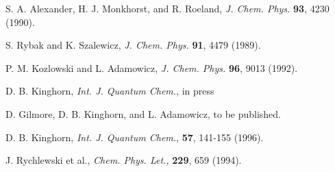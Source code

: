 \begin{thebibliography}{99}
  S. A. Alexander, H. J. Monkhorst, and R. Roeland, {\it %
J. Chem. Phys. }{\bf 93}, 4230 (1990).

  S. Rybak and K. Szalewicz, {\it J. Chem. Phys. }{\bf 91},
4479 (1989).

  P. M. Kozlowski and L. Adamowicz, {\it J. Chem. Phys.} 
{\bf 96}, 9013 (1992).

  D. B. Kinghorn, {\it Int. J. Quantum Chem.}, in press

  D. Gilmore, D. B. Kinghorn, and L. Adamowicz, to be
published.

  D. B. Kinghorn, {\it Int. J. Quantum Chem.}, {\bf 57},
141-155 (1996).

  J. Rychlewski et al., {\it Chem. Phys. Let.,} {\bf 229},
659 (1994).
\end{thebibliography}

\enddocument


